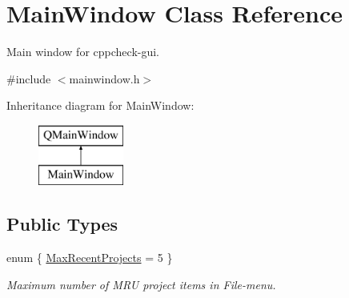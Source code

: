 \hypertarget{class_main_window}{\section{Main\-Window Class Reference}
\label{class_main_window}
}


Main window for cppcheck-\/gui.  




{\ttfamily \#include $<$mainwindow.\-h$>$}

Inheritance diagram for Main\-Window\-:\begin{figure}[H]
\begin{center}
\leavevmode
\includegraphics[height=2.000000cm]{class_main_window}
\end{center}
\end{figure}
\subsection*{Public Types}
\begin{DoxyCompactItemize}
\item 
enum \{ \hyperlink{class_main_window_a97b4dedaa96eb7c2b44ac65d9396f058a18568d93004c241de47517836fe361a2}{Max\-Recent\-Projects} = 5
 \}
\begin{DoxyCompactList}\small\item\em Maximum number of M\-R\-U project items in File-\/menu. \end{DoxyCompactList}\end{DoxyCompactItemize}
